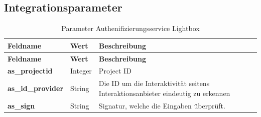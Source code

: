 \subsection{Integrationsparameter}\label{integrationsparameter}

\begin{longtable}[c]{@{}lll@{}}
\caption{Parameter Authenifizierungsservice Lightbox}\tabularnewline
\toprule
\begin{minipage}[b]{0.30\columnwidth}\raggedright\strut
\textbf{Feldname}
\strut\end{minipage} &
\begin{minipage}[b]{0.17\columnwidth}\raggedright\strut
\textbf{Wert}
\strut\end{minipage} &
\begin{minipage}[b]{0.43\columnwidth}\raggedright\strut
\textbf{Beschreibung}
\strut\end{minipage}\tabularnewline
\midrule
\endfirsthead
\toprule
\begin{minipage}[b]{0.30\columnwidth}\raggedright\strut
\textbf{Feldname}
\strut\end{minipage} &
\begin{minipage}[b]{0.17\columnwidth}\raggedright\strut
\textbf{Wert}
\strut\end{minipage} &
\begin{minipage}[b]{0.43\columnwidth}\raggedright\strut
\textbf{Beschreibung}
\strut\end{minipage}\tabularnewline
\midrule
\endhead
\begin{minipage}[t]{0.30\columnwidth}\raggedright\strut
\textbf{as\_projectid}
\strut\end{minipage} &
\begin{minipage}[t]{0.17\columnwidth}\raggedright\strut
Integer
\strut\end{minipage} &
\begin{minipage}[t]{0.43\columnwidth}\raggedright\strut
Project ID
\strut\end{minipage}\tabularnewline
\begin{minipage}[t]{0.30\columnwidth}\raggedright\strut
\textbf{as\_id\_provider}
\strut\end{minipage} &
\begin{minipage}[t]{0.17\columnwidth}\raggedright\strut
String
\strut\end{minipage} &
\begin{minipage}[t]{0.43\columnwidth}\raggedright\strut
Die ID um die Interaktivität seitens Interaktionsanbieter eindeutig zu
erkennen
\strut\end{minipage}\tabularnewline
\begin{minipage}[t]{0.30\columnwidth}\raggedright\strut
\textbf{as\_sign}
\strut\end{minipage} &
\begin{minipage}[t]{0.17\columnwidth}\raggedright\strut
String
\strut\end{minipage} &
\begin{minipage}[t]{0.43\columnwidth}\raggedright\strut
Signatur, welche die Eingaben überprüft.
\strut\end{minipage}\tabularnewline
\bottomrule
\end{longtable}

